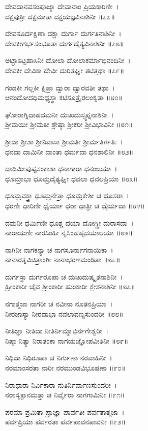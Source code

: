 ದೇವದಾನವಸಂಪೂಜ್ಯಾ ದೇವಾನಾಂ ಪ್ರಿಯಕಾರಿಣೀ~।\\
ದಕ್ಷಪುತ್ರೀ ದಕ್ಷಮಾತಾ ದಕ್ಷಯಜ್ಞವಿನಾಶಿನೀ ॥೭೭॥

ದೇವಸೂರ್ದಕ್ಷಿಣಾ ದಕ್ಷಾ ದುರ್ಗಾ ದುರ್ಗತಿನಾಶಿನೀ~।\\
ದೇವಕೀಗರ್ಭಸಂಭೂತಾ ದುರ್ಗದೈತ್ಯವಿನಾಶಿನೀ ॥೭೮॥

ಅಟ್ಟಾಽಟ್ಟಹಾಸಿನೀ ದೋಲಾ ದೋಲಾಕರ್ಮಾಭಿನಂದಿನೀ~।\\
ದೇವಕೀ ದೇವಿಕಾ ದೇವೀ ದುರಿತಘ್ನೀ ತಟಿತ್ತಥಾ ॥೭೯॥

ಗಂಡಕೀ ಗಲ್ಲಕೀ ಕ್ಷಿಪ್ರಾ ದ್ವಾರಾ ದ್ವಾರವತೀ ತಥಾ~।\\
ಆನಂದೋದಧಿಮಧ್ಯಸ್ಥಾ ಕಟಿಸೂತ್ರೈರಲಂಕೃತಾ ॥೮೦॥

ಘೋರಾಗ್ನಿದಾಹದಮನೀ ದುಃಖದುಸ್ಸ್ವಪ್ನನಾಶಿನೀ~।\\
ಶ್ರೀಮಯೀ ಶ್ರೀಮತೀ ಶ್ರೇಷ್ಠಾ ಶ್ರೀಕರೀ ಶ್ರೀವಿಭಾವಿನೀ ॥೮೧॥

ಶ್ರೀದಾ ಶ್ರೀಶಾ ಶ್ರೀನಿವಾಸಾ ಶ್ರೀಮತೀ ಶ್ರೀರ್ಮತಿರ್ಗತಿಃ~।\\
ಧನದಾ ದಾಮಿನೀ ದಾಂತಾ ಧರ್ಮದಾ ಧನಶಾಲಿನೀ ॥೮೨॥

ದಾಡಿಮೀಪುಷ್ಪಸಂಕಾಶಾ ಧನಾಗಾರಾ ಧನಂಜಯಾ~।\\
ಧೂಮ್ರಾಭಾ ಧೂಮ್ರದೈತ್ಯಘ್ನೀ ಧವಲಾ ಧವಲಪ್ರಿಯಾ ॥೮೩॥

ಧೂಮ್ರವಕ್ತ್ರಾ ಧೂಮ್ರನೇತ್ರಾ ಧೂಮ್ರಕೇಶೀ ಚ ಧೂಸರಾ~।\\
ಧರಣೀ ಧಾರಿಣೀ ಧೈರ್ಯಾ ಧರಾ ಧಾತ್ರೀ ಚ ಧೈರ್ಯದಾ ॥೮೪॥

ದಮನೀ ಧರ್ಮಿಣೀ ಧೂಶ್ಚ ದಯಾ ದೋಗ್ಧ್ರೀ ದುರಾಸದಾ~।\\
ನಾರಾಯಣೀ ನಾರಸಿಂಹೀ ನೃಸಿಂಹಹೃದಯಾಲಯಾ ॥೮೫॥

ನಾಗಿನೀ ನಾಗಕನ್ಯಾ ಚ ನಾಗಸೂರ್ನಾಗನಾಯಿಕಾ~।\\
ನಾನಾರತ್ನವಿಚಿತ್ರಾಂಗೀ ನಾನಾಭರಣಮಂಡಿತಾ ॥೮೬॥

ದುರ್ಗಸ್ಥಾ ದುರ್ಗರೂಪಾ ಚ ದುಃಖದುಷ್ಕೃತನಾಶಿನೀ~।\\
ಹ್ರೀಂಕಾರೀ ಚೈವ ಶ್ರೀಂಕಾರೀ ಹುಂಕಾರೀ ಕ್ಲೇಶನಾಶಿನೀ ॥೮೭॥

ನಗಾತ್ಮಜಾ ನಾಗರೀ ಚ ನವೀನಾ ನೂತನಪ್ರಿಯಾ~।\\
ನೀರಜಾಸ್ಯಾ ನೀರದಾಭಾ ನವಲಾವಣ್ಯಸುಂದರೀ ॥೮೮॥

ನೀತಿಜ್ಞಾ ನೀತಿದಾ ನೀತಿರ್ನಿಮ್ನಾಭಿರ್ನಗೇಶ್ವರೀ~।\\
ನಿಷ್ಠಾ ನಿತ್ಯಾ ನಿರಾತಂಕಾ ನಾಗಯಜ್ಞೋಪವೀತಿನೀ ॥೮೯॥

ನಿಧಿದಾ ನಿಧಿರೂಪಾ ಚ ನಿರ್ಗುಣಾ ನರವಾಹಿನೀ~।\\
ನರಮಾಂಸರತಾ ನಾರೀ ನರಮುಂಡವಿಭೂಷಣಾ ॥೯೦॥

ನಿರಾಧಾರಾ ನಿರ್ವಿಕಾರಾ ನುತಿರ್ನಿರ್ವಾಣಸುಂದರೀ~।\\
ನರಾಸೃಕ್ಪಾನಮತ್ತಾ ಚ ನಿರ್ವೈರಾ ನಾಗಗಾಮಿನೀ ॥೯೧॥

ಪರಮಾ ಪ್ರಮಿತಾ ಪ್ರಾಜ್ಞಾ ಪಾರ್ವತೀ ಪರ್ವತಾತ್ಮಜಾ~।\\
ಪರ್ವಪ್ರಿಯಾ ಪರ್ವರತಾ ಪರ್ವಪಾವನಪಾವನೀ ॥೯೨॥

